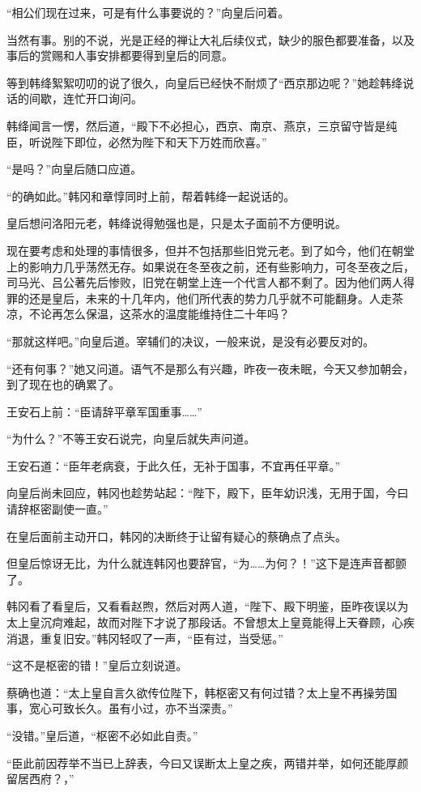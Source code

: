 “相公们现在过来，可是有什么事要说的？”向皇后问着。

当然有事。别的不说，光是正经的禅让大礼后续仪式，缺少的服色都要准备，以及事后的赏赐和人事安排都要得到皇后的同意。

等到韩绛絮絮叨叨的说了很久，向皇后已经快不耐烦了“西京那边呢？”她趁韩绛说话的间歇，连忙开口询问。

韩绛闻言一愣，然后道，“殿下不必担心，西京、南京、燕京，三京留守皆是纯臣，听说陛下即位，必然为陛下和天下万姓而欣喜。”

“是吗？”向皇后随口应道。

“的确如此。”韩冈和章惇同时上前，帮着韩绛一起说话的。

皇后想问洛阳元老，韩绛说得勉强也是，只是太子面前不方便明说。

现在要考虑和处理的事情很多，但并不包括那些旧党元老。到了如今，他们在朝堂上的影响力几乎荡然无存。如果说在冬至夜之前，还有些影响力，可冬至夜之后，司马光、吕公著先后惨败，旧党在朝堂上连一个代言人都不剩了。因为他们两人得罪的还是皇后，未来的十几年内，他们所代表的势力几乎就不可能翻身。人走茶凉，不论再怎么保温，这茶水的温度能维持住二十年吗？

“那就这样吧。”向皇后道。宰辅们的决议，一般来说，是没有必要反对的。

“还有何事？”她又问道。语气不是那么有兴趣，昨夜一夜未眠，今天又参加朝会，到了现在也的确累了。

王安石上前：“臣请辞平章军国重事……”

“为什么？”不等王安石说完，向皇后就失声问道。

王安石道：“臣年老病衰，于此久任，无补于国事，不宜再任平章。”

向皇后尚未回应，韩冈也趁势站起：“陛下，殿下，臣年幼识浅，无用于国，今曰请辞枢密副使一直。”

在皇后面前主动开口，韩冈的决断终于让留有疑心的蔡确点了点头。

但皇后惊讶无比，为什么就连韩冈也要辞官，“为……为何？！”这下是连声音都颤了。

韩冈看了看皇后，又看看赵煦，然后对两人道，“陛下、殿下明鉴，臣昨夜误以为太上皇沉疴难起，故而对陛下才说了那段话。不曾想太上皇竟能得上天眷顾，心疾消退，重复旧安。”韩冈轻叹了一声，“臣有过，当受惩。”

“这不是枢密的错！”皇后立刻说道。

蔡确也道：“太上皇自言久欲传位陛下，韩枢密又有何过错？太上皇不再操劳国事，宽心可致长久。虽有小过，亦不当深责。”

“没错。”皇后道，“枢密不必如此自责。”

“臣此前因荐举不当已上辞表，今曰又误断太上皇之疾，两错并举，如何还能厚颜留居西府？，”

